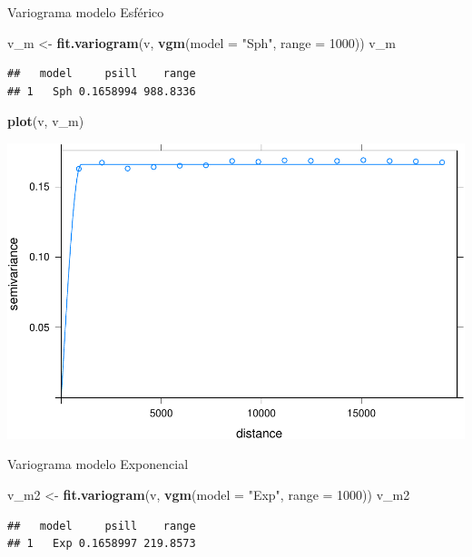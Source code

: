 \documentclass[11pt,]{article}
\newenvironment{Shaded}{\begin{snugshade}}{\end{snugshade}}
\newcommand{\KeywordTok}[1]{\textcolor[rgb]{0.13,0.29,0.53}{\textbf{#1}}}
\newcommand{\DataTypeTok}[1]{\textcolor[rgb]{0.13,0.29,0.53}{#1}}
\newcommand{\DecValTok}[1]{\textcolor[rgb]{0.00,0.00,0.81}{#1}}
\newcommand{\StringTok}[1]{\textcolor[rgb]{0.31,0.60,0.02}{#1}}
\newcommand{\NormalTok}[1]{#1}
\begin{document}
Variograma modelo Esférico

\begin{Shaded}
\begin{Highlighting}[]
\NormalTok{v_m <-}\StringTok{ }\KeywordTok{fit.variogram}\NormalTok{(v, }\KeywordTok{vgm}\NormalTok{(}\DataTypeTok{model =} \StringTok{"Sph"}\NormalTok{, }\DataTypeTok{range =} \DecValTok{1000}\NormalTok{))}
\NormalTok{v_m}
\end{Highlighting}
\end{Shaded}

\begin{verbatim}
##   model     psill    range
## 1   Sph 0.1658994 988.8336
\end{verbatim}

\begin{Shaded}
\begin{Highlighting}[]
\KeywordTok{plot}\NormalTok{(v, v_m)}
\end{Highlighting}
\end{Shaded}

\includegraphics{proyecto_f_files/figure-latex/unnamed-chunk-93-1.pdf}

Variograma modelo Exponencial

\begin{Shaded}
\begin{Highlighting}[]
\NormalTok{v_m2 <-}\StringTok{ }\KeywordTok{fit.variogram}\NormalTok{(v, }\KeywordTok{vgm}\NormalTok{(}\DataTypeTok{model =} \StringTok{"Exp"}\NormalTok{, }\DataTypeTok{range =} \DecValTok{1000}\NormalTok{))}
\NormalTok{v_m2}
\end{Highlighting}
\end{Shaded}

\begin{verbatim}
##   model     psill    range
## 1   Exp 0.1658997 219.8573
\end{verbatim}
\end{document}
